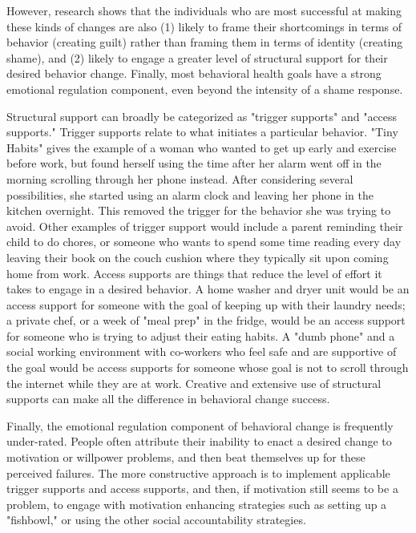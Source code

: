 \documentclass[12pt,letterpaper]{book}
\begin{document}
However, research shows that the individuals who are most successful at making these kinds of changes are also (1) likely to frame their shortcomings in terms of behavior (creating guilt) rather than framing them in terms of identity (creating shame), and (2) likely to engage a greater level of structural support for their desired behavior change. Finally, most behavioral health goals have a strong emotional regulation component, even beyond the intensity of a shame response.

Structural support can broadly be categorized as "trigger supports" and "access supports." Trigger supports relate to what initiates a particular behavior. "Tiny Habits" gives the example of a woman who wanted to get up early and exercise before work, but found herself using the time after her alarm went off in the morning scrolling through her phone instead. After considering several possibilities, she started using an alarm clock and leaving her phone in the kitchen overnight. This removed the trigger for the behavior she was trying to avoid. Other examples of trigger support would include a parent reminding their child to do chores, or someone who wants to spend some time reading every day leaving their book on the couch cushion where they typically sit upon coming home from work. Access supports are things that reduce the level of effort it takes to engage in a desired behavior. A home washer and dryer unit would be an access support for someone with the goal of keeping up with their laundry needs; a private chef, or a week of "meal prep" in the fridge, would be an access support for someone who is trying to adjust their eating habits. A "dumb phone" and a social working environment with co-workers who feel safe and are supportive of the goal would be access supports for someone whose goal is not to scroll through the internet while they are at work. Creative and extensive use of structural supports can make all the difference in behavioral change success.

Finally, the emotional regulation component of behavioral change is frequently under-rated. People often attribute their inability to enact a desired change to motivation or willpower problems, and then beat themselves up for these perceived failures. The more constructive approach is to implement applicable trigger supports and access supports, and then, if motivation still seems to be a problem, to engage with motivation enhancing strategies such as setting up a "fishbowl," or using the other social accountability strategies. 
\end{document}
